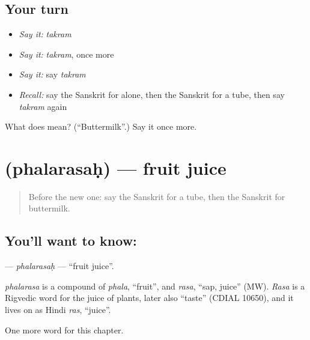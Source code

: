 \subsection*{Your turn}
\begin{itemize}
\raggedright
  \item \emph{Say it:} \emph{takram}
  \item \emph{Say it:} \emph{takram}, once more
  \item \emph{Say it:} say \emph{takram}
  \item \emph{Recall:} say the Sanskrit for alone, then the Sanskrit for a tube, then say \emph{takram} again
\end{itemize}

\begin{tcolorbox}[breakable,colback=teal!4,colframe=teal!35!black,title={Before you move on}]
What does  mean? (\textquotedblleft{}Buttermilk\textquotedblright{}.) Say it once more.
\end{tcolorbox}
\section[\texorpdfstring{\sk{फलरसः} (phalarasaḥ)}{फलरसः (phalarasaḥ)}]{ (phalarasaḥ) — fruit juice}

\label{lesson:SA-C245-phalarasah}



\begin{quote}
Before the new one: say the Sanskrit for a tube, then the Sanskrit for buttermilk.
\end{quote}

\subsection*{You'll want to know: }
\textbf{} — \emph{phalarasaḥ} — \textquotedblleft{}fruit juice\textquotedblright{}.

\begin{cousinweb}
\emph{phalarasa} is a compound of \emph{phala}, \textquotedblleft{}fruit\textquotedblright{}, and \emph{rasa}, \textquotedblleft{}sap, juice\textquotedblright{} (MW). \emph{Rasa} is a Rigvedic word for the juice of plants, later also \textquotedblleft{}taste\textquotedblright{} (CDIAL 10650), and it lives on as Hindi \emph{ras}, \textquotedblleft{}juice\textquotedblright{}.
\end{cousinweb}

\begin{grammarlens}[title={What you've built}]
One more word for this chapter.
\end{grammarlens}

